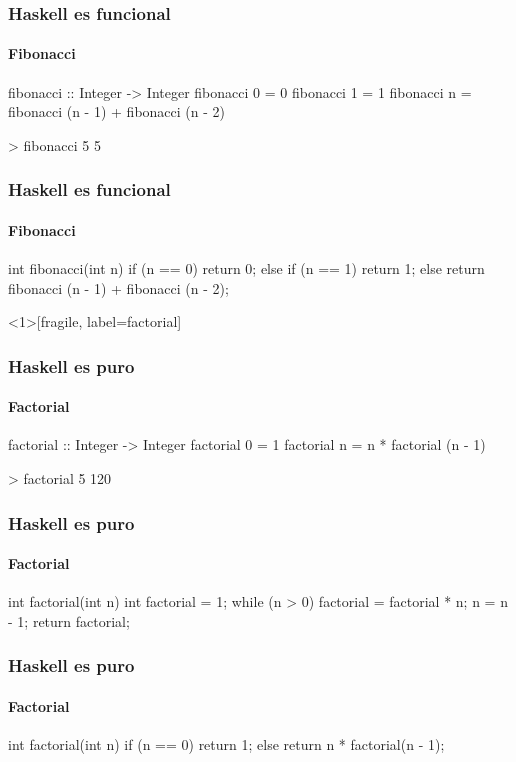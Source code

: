 \documentclass[spanish]{beamer}
\begin{document}

\begin{frame}[fragile]
  \frametitle{Haskell es funcional}
  \framesubtitle{Fibonacci}

  \begin{code}
fibonacci :: Integer -> Integer
fibonacci 0 = 0
fibonacci 1 = 1
fibonacci n = fibonacci (n - 1) + fibonacci (n - 2)
  \end{code}

  \begin{code}
> fibonacci 5
5
  \end{code}
\end{frame}


\begin{frame}[fragile]
  \frametitle{Haskell es funcional}
  \framesubtitle{Fibonacci}

  \begin{code}
int fibonacci(int n) {
  if (n == 0)
    return 0;
  else if (n == 1)
    return 1;
  else
    return fibonacci (n - 1) + fibonacci (n - 2);
}
  \end{code}
\end{frame}


\begin{frame}<1>[fragile, label=factorial]
  \frametitle{Haskell es puro}
  \framesubtitle{Factorial}

  \begin{code}
factorial :: Integer -> Integer
factorial 0 = 1
factorial n = n * factorial (n - 1)
  \end{code}

  \begin{code}
> factorial 5
120
  \end{code}
\end{frame}


\begin{frame}[fragile]
  \frametitle{Haskell es puro}
  \framesubtitle{Factorial}

  \begin{code}
int factorial(int n) {
  int factorial = 1;
  while (n > 0) {
    factorial = factorial * n;
    n = n - 1;
  }
  return factorial;
}
  \end{code}
\end{frame}


\begin{frame}[fragile]
  \frametitle{Haskell es puro}
  \framesubtitle{Factorial}

  \begin{code}
int factorial(int n) {
  if (n == 0)
    return 1;
  else
    return n * factorial(n - 1);
}
  \end{code}
\end{frame}
\end{document}
